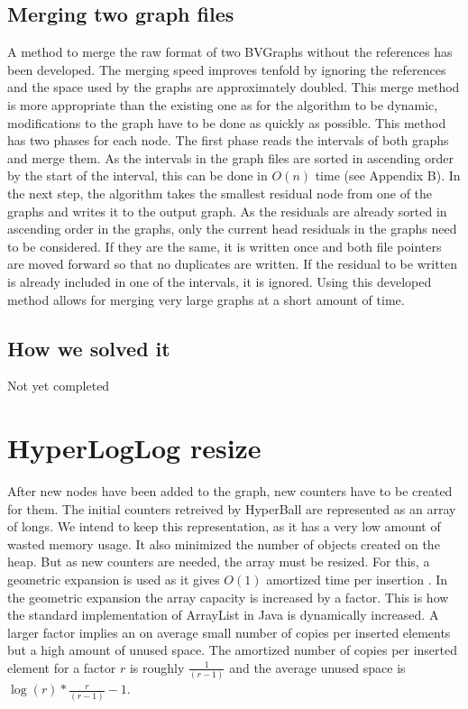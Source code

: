 \subsection{Merging two graph files}
A method to merge the raw format of two BVGraphs without the references has been developed. The merging speed improves  tenfold by ignoring the references and the space used by the graphs are approximately doubled. This merge method is more appropriate than the existing one as for the algorithm to be dynamic, modifications to the graph have to be done as quickly as possible. This method has two phases for each node. The first phase reads the intervals of both graphs and merge them. As the intervals in the graph files are sorted in ascending order by the start of the interval, this can be done in $O(n)$ time (see Appendix B). In the next step, the algorithm takes the smallest residual node from one of the graphs and writes it to the output graph. As the residuals are already sorted in ascending order in the graphs, only the current head residuals in the graphs need to be considered. If they are the same, it is written once and both file pointers are moved forward so that no duplicates are written. If the residual to be written is already included in one of the intervals, it is ignored. Using this developed method allows for merging very large graphs at a short amount of time.

\subsection{How we solved it}
Not yet completed

\section{HyperLogLog resize}
After new nodes have been added to the graph, new counters have to be created for them. The initial counters retreived by HyperBall are represented as an array of longs. We intend to keep this representation, as it has a very low amount of wasted memory usage. It also minimized the number of objects created on the heap. But as new counters are needed, the array must be resized. For this, a geometric expansion is used as it gives $O(1)$ amortized time per insertion \cite{dynamicarrays}. In the geometric expansion the array capacity is increased by a factor. This is how the standard implementation of ArrayList in Java is dynamically increased. A larger factor implies an on average small number of copies per inserted elements but a high amount of unused space. The amortized number of copies per inserted element for a factor $r$ is roughly $\frac{1}{(r-1)}$ and the average unused space is $\log(r)*\frac{r}{(r-1)} - 1$. \cite{dynamicarrays}

